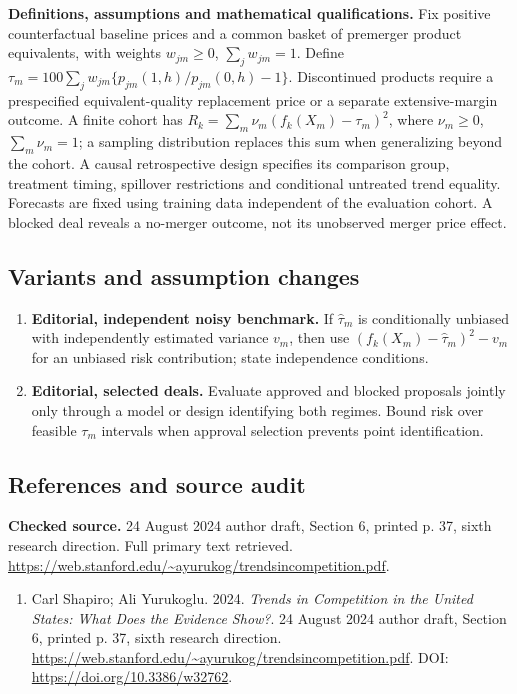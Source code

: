 \documentclass[11pt,a4paper]{article}
\begin{document}
\textbf{Definitions, assumptions and mathematical qualifications.} Fix positive counterfactual baseline prices and a common basket of premerger product equivalents, with weights \(w_{jm}\geq0\), \(\sum_jw_{jm}=1\). Define \(\tau_m=100\sum_jw_{jm}\{p_{jm}(1,h)/p_{jm}(0,h)-1\}\). Discontinued products require a prespecified equivalent-quality replacement price or a separate extensive-margin outcome. A finite cohort has \(R_k=\sum_m\nu_m(f_k(X_m)-\tau_m)^2\), where \(\nu_m\geq0\), \(\sum_m\nu_m=1\); a sampling distribution replaces this sum when generalizing beyond the cohort. A causal retrospective design specifies its comparison group, treatment timing, spillover restrictions and conditional untreated trend equality. Forecasts are fixed using training data independent of the evaluation cohort. A blocked deal reveals a no-merger outcome, not its unobserved merger price effect.
\subsection*{Variants and assumption changes}
\begin{enumerate}
\item \textbf{Editorial, independent noisy benchmark.} If \(\widehat\tau_m\) is conditionally unbiased with independently estimated variance \(v_m\), then use \((f_k(X_m)-\widehat\tau_m)^2-v_m\) for an unbiased risk contribution; state independence conditions.
\item \textbf{Editorial, selected deals.} Evaluate approved and blocked proposals jointly only through a model or design identifying both regimes. Bound risk over feasible \(\tau_m\) intervals when approval selection prevents point identification.
\end{enumerate}
\subsection*{References and source audit}
\textbf{Checked source.} 24 August 2024 author draft, Section 6, printed p. 37, sixth research direction. Full primary text retrieved. \url{https://web.stanford.edu/~ayurukog/trendsincompetition.pdf}.
\begin{enumerate}\raggedright
\item\hypertarget{definitions:source:30007674:1}{} Carl Shapiro; Ali Yurukoglu. 2024. \emph{Trends in Competition in the United States: What Does the Evidence Show?}. 24 August 2024 author draft, Section 6, printed p. 37, sixth research direction.
\url{https://web.stanford.edu/~ayurukog/trendsincompetition.pdf}.
DOI: \url{https://doi.org/10.3386/w32762}.
\end{enumerate}
\end{document}

